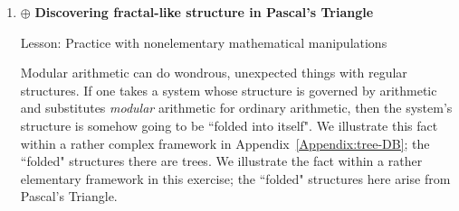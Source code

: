 \begin{enumerate}
\medskip\item
$\oplus$
{\bf Discovering fractal-like structure in Pascal's Triangle}

{\sc Lesson:} Practice with nonelementary mathematical manipulations

\smallskip


Modular arithmetic can do wondrous, unexpected things with regular structures.  If one takes a system whose structure is governed by arithmetic and substitutes {\em modular} arithmetic for ordinary arithmetic, then the system's structure is somehow going to be ``folded into itself".  We illustrate this fact within a rather complex framework in Appendix~\ref{Appendix:tree-DB}; the ``folded" structures there are trees.  We illustrate the fact within a rather elementary framework in this exercise; the ``folded" structures here arise from Pascal's Triangle.

\medskip


\end{enumerate}
